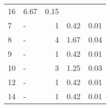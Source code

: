 \begin{longtable}{lXrrr}
       \num{16} &
       \num[round-mode=places,round-precision=2]{6,67} &
         \num[round-mode=places,round-precision=2]{0,15} \\

     7 &
     \multicolumn{1}{X}{ -  } &


       \num{1} &
       \num[round-mode=places,round-precision=2]{0,42} &
         \num[round-mode=places,round-precision=2]{0,01} \\

     8 &
     \multicolumn{1}{X}{ -  } &


       \num{4} &
       \num[round-mode=places,round-precision=2]{1,67} &
         \num[round-mode=places,round-precision=2]{0,04} \\

     9 &
     \multicolumn{1}{X}{ -  } &


       \num{1} &
       \num[round-mode=places,round-precision=2]{0,42} &
         \num[round-mode=places,round-precision=2]{0,01} \\

     10 &
     \multicolumn{1}{X}{ -  } &


       \num{3} &
       \num[round-mode=places,round-precision=2]{1,25} &
         \num[round-mode=places,round-precision=2]{0,03} \\

     12 &
     \multicolumn{1}{X}{ -  } &


       \num{1} &
       \num[round-mode=places,round-precision=2]{0,42} &
         \num[round-mode=places,round-precision=2]{0,01} \\

     14 &
     \multicolumn{1}{X}{ -  } &


       \num{1} &
       \num[round-mode=places,round-precision=2]{0,42} &
         \num[round-mode=places,round-precision=2]{0,01} \\


\end{longtable}
